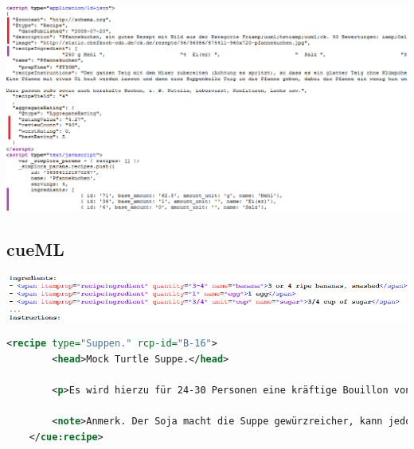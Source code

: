 \documentclass[12pt]{beamer}
\begin{document}
\begin{frame}{}
	\includegraphics[width=1.4\textwidth]{Images/googleEnrichedResultJS}
\end{frame}


\subsection{cueML}
\begin{frame}{}
	\includegraphics[width=1\textwidth]{Images/exampleCueML} \\
\end{frame}

\begin{frame}[fragile]
	\begin{lstlisting}[language=XML, caption={Beispiel Rezept von Frau Davidis}]
	<recipe type="Suppen." rcp-id="B-16">
		<head>Mock Turtle Suppe.</head>	
		
		<p>Es wird hierzu für 24-30 Personen eine kräftige Bouillon von 8-10 Pfund Rindfleisch mit Wurzelwerk gekocht. Zugleich bringt man einen großen Kalbskopf, eine Schweineschnauze und Ohren, einen Ochsengaumen und eine geräucherte Ochsenzunge zu Feuer und kocht dies Alles gahr, aber nicht zu weich. Kalt, schneidet man es in kleine, länglich viereckige Stückchen, gibt das Fleisch in die Bouillon, nebst braunem Gewürz, ein Paar Messerspitzen Cayenne-Pfeffer, einige Kalbsmidder in Stückchen geschnitten (siehe Vorbereitungsregeln), kleine Saucissen, so viel Kalbskopfbrühe, daß man hinreichend Suppe hat, und macht dies mit in Butter braun gemachtem Mehl gebunden. Nachdem dies Alles 1/4 Stunde gekocht hat, kommen noch Klöße von Kalbfleisch, einige hart gekochte Eier in Würfel geschnitten, ein Paar Eßlöffel Engl. Soja hinzu, und wenn die Klößchen einige Minuten gekocht haben, 1/2 Flasche Madeira und auch Austern, wenn man sie haben kann. Dann wird die Suppe sogleich angerichtet.</p>	
			
		<note>Anmerk. Der Soja macht die Suppe gewürzreicher, kann jedoch gut wegbleiben, und statt Madeira kann man weißen Franzwein und etwas Rum nehmen. Sowohl die Bouillon als Kalbskopf können schon am vorhergehenden Tage, ohne Nachtheil der Suppe, gekocht werden. </note>
	</cue:recipe>
	\end{lstlisting}
\end{frame}
\end{document}
